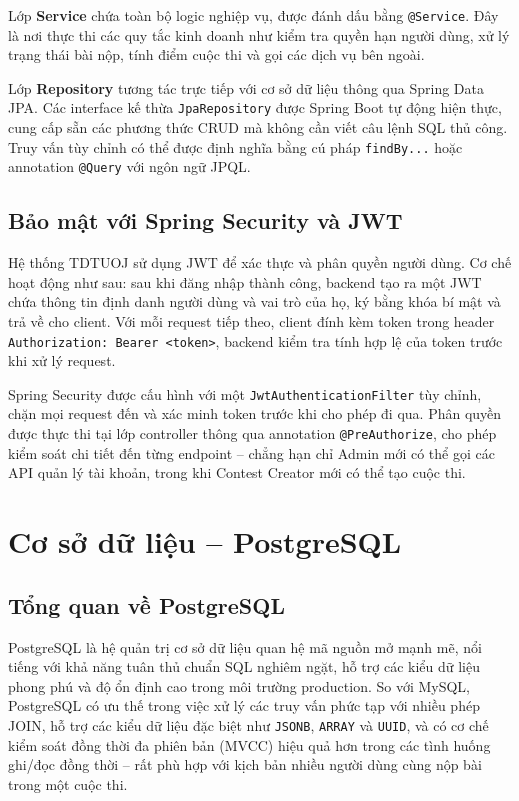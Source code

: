 \documentclass[12pt, a4paper]{report}
\begin{document}
Lớp \textbf{Service} chứa toàn bộ logic nghiệp vụ, được đánh dấu bằng \texttt{@Service}. Đây là nơi thực thi các quy tắc kinh doanh như kiểm tra quyền hạn người dùng, xử lý trạng thái bài nộp, tính điểm cuộc thi và gọi các dịch vụ bên ngoài.

Lớp \textbf{Repository} tương tác trực tiếp với cơ sở dữ liệu thông qua Spring Data \ac{JPA}. Các interface kế thừa \texttt{JpaRepository} được Spring Boot tự động hiện thực, cung cấp sẵn các phương thức CRUD mà không cần viết câu lệnh SQL thủ công. Truy vấn tùy chỉnh có thể được định nghĩa bằng cú pháp \texttt{findBy...} hoặc annotation \texttt{@Query} với ngôn ngữ JPQL.

\subsection{Bảo mật với Spring Security và JWT}

Hệ thống TDTUOJ sử dụng \ac{JWT} để xác thực và phân quyền người dùng. Cơ chế hoạt động như sau: sau khi đăng nhập thành công, backend tạo ra một JWT chứa thông tin định danh người dùng và vai trò của họ, ký bằng khóa bí mật và trả về cho client. Với mỗi request tiếp theo, client đính kèm token trong header \texttt{Authorization: Bearer <token>}, backend kiểm tra tính hợp lệ của token trước khi xử lý request.

Spring Security được cấu hình với một \texttt{JwtAuthenticationFilter} tùy chỉnh, chặn mọi request đến và xác minh token trước khi cho phép đi qua. Phân quyền được thực thi tại lớp controller thông qua annotation \texttt{@PreAuthorize}, cho phép kiểm soát chi tiết đến từng endpoint -- chẳng hạn chỉ Admin mới có thể gọi các API quản lý tài khoản, trong khi Contest Creator mới có thể tạo cuộc thi.

\section{Cơ sở dữ liệu -- PostgreSQL}

\subsection{Tổng quan về PostgreSQL}

PostgreSQL là hệ quản trị cơ sở dữ liệu quan hệ mã nguồn mở mạnh mẽ, nổi tiếng với khả năng tuân thủ chuẩn SQL nghiêm ngặt, hỗ trợ các kiểu dữ liệu phong phú và độ ổn định cao trong môi trường production. So với MySQL, PostgreSQL có ưu thế trong việc xử lý các truy vấn phức tạp với nhiều phép JOIN, hỗ trợ các kiểu dữ liệu đặc biệt như \texttt{JSONB}, \texttt{ARRAY} và \texttt{UUID}, và có cơ chế kiểm soát đồng thời đa phiên bản (MVCC) hiệu quả hơn trong các tình huống ghi/đọc đồng thời -- rất phù hợp với kịch bản nhiều người dùng cùng nộp bài trong một cuộc thi.
\end{document}
